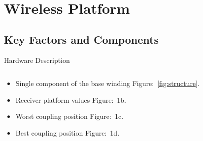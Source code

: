 \section{Wireless Platform}
\label{sec:wireless}
  \subsection{Key Factors and Components}

\begin{frame}{Hardware Description}
    \begin{columns}[t] %
      \begin{column}[T]{5cm} %
        \begin{itemize}
            \item<+-| alert@+> Single component of the base winding Figure:~\autoref{fig:structure}.
            \item<+-| alert@+> Receiver platform values Figure:~1b.
            \item<+-| alert@+> Worst coupling position Figure:~1c.
            \item<+-| alert@+> Best coupling position Figure:~1d.
          \end{itemize}  
      \end{column}
    \begin{column}[T]{5cm} %
      \begin{figure}
\end{figure}
\end{column}
\end{columns}
\end{frame}
